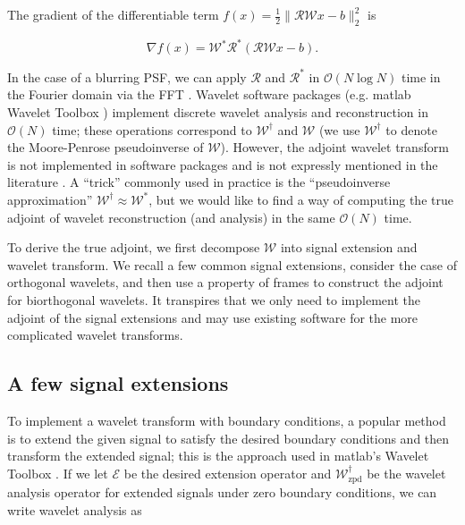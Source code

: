 \documentclass[journal]{IEEEtran}
\begin{document}
The gradient of the differentiable term $f(x)={\frac{1}{2}\|\mathcal{RW}x-b\|_2^2}$ is

\[ \nabla f(x) = \mathcal{W}^\ast \mathcal{R}^\ast(\mathcal{RW}x-b). \] 

\noindent In the case of a blurring PSF, we can apply $\mathcal{R}$ and $\mathcal{R}^\ast$ in $\mathcal{O}(N\log N)$ time in the Fourier domain via the FFT \cite{beck_2009, hansen_2006}.  Wavelet software packages (e.g. {\sc matlab} Wavelet Toolbox \cite{matlab_wt_2015}) implement discrete wavelet analysis and reconstruction in $\mathcal{O}(N)$ time; these operations correspond to $\mathcal{W}^\dagger$ and $\mathcal{W}$ (we use $\mathcal{W}^\dagger$ to denote the Moore-Penrose pseudoinverse of $\mathcal{W}$).  However, the adjoint wavelet transform is not implemented in software packages and is not expressly mentioned in the literature \cite{mallat_2009, daubechies_1992, strang_1996}.  A ``trick'' commonly used in practice is the ``pseudoinverse approximation'' $\mathcal{W}^\dagger\approx\mathcal{W}^\ast$, but we would like to find a way of computing the true adjoint of wavelet reconstruction (and analysis) in the same $\mathcal{O}(N)$ time. 



To derive the true adjoint, we first decompose $\mathcal{W}$ into signal extension and wavelet transform.  We recall a few common signal extensions, consider the case of orthogonal wavelets, and then use a property of frames to construct the adjoint for biorthogonal wavelets.  It transpires that we only need to implement the adjoint of the signal extensions and may use existing software for the more complicated wavelet transforms.

\subsection{A few signal extensions}
To implement a wavelet transform with boundary conditions, a popular method is to extend the given signal to satisfy the desired boundary conditions and then transform the extended signal; this is the approach used in {\sc matlab}'s Wavelet Toolbox \cite{matlab_wt_2015}.  If we let $\mathcal{E}$ be the desired extension operator and $\mathcal{W}^\dagger_\text{zpd}$ be the wavelet analysis operator for extended signals under zero boundary conditions, we can write wavelet analysis as 
\end{document}
